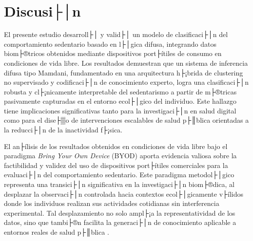 ﻿%

\chapter{Discusi├│n}
\label{cap:discusion}


\noindent El presente estudio desarroll├│ y valid├│ un modelo de clasificaci├│n del comportamiento sedentario basado en l├│gica difusa, integrando datos biom├®tricos obtenidos mediante dispositivos port├ítiles de consumo en condiciones de vida libre. Los resultados demuestran que un sistema de inferencia difusa tipo Mamdani, fundamentado en una arquitectura h├¡brida de clustering no supervisado y codificaci├│n de conocimiento experto, logra una clasificaci├│n robusta y cl├¡nicamente interpretable del sedentarismo a partir de m├®tricas pasivamente capturadas en el entorno ecol├│gico del individuo. Este hallazgo tiene implicaciones significativas tanto para la investigaci├│n en salud digital como para el dise├▒o de intervenciones escalables de salud p├║blica orientadas a la reducci├│n de la inactividad f├¡sica.

El an├ílisis de los resultados obtenidos en condiciones de vida libre bajo el paradigma \textit{Bring Your Own Device} (BYOD) aporta evidencia valiosa sobre la factibilidad y validez del uso de dispositivos port├ítiles comerciales para la evaluaci├│n del comportamiento sedentario. Este paradigma metodol├│gico representa una transici├│n significativa en la investigaci├│n biom├®dica, al desplazar la observaci├│n controlada hacia contextos ecol├│gicamente v├ílidos donde los individuos realizan sus actividades cotidianas sin interferencia experimental. Tal desplazamiento no solo ampl├¡a la representatividad de los datos, sino que tambi├®n facilita la generaci├│n de conocimiento aplicable a entornos reales de salud p├║blica \cite{Doherty2021,Liu2022}.

